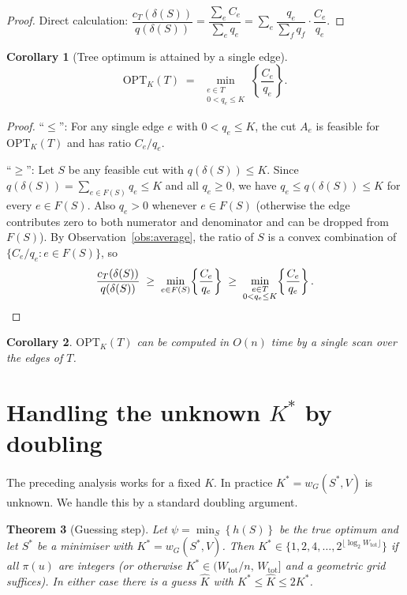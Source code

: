 \documentclass[11pt]{article}
\newtheorem{theorem}{Theorem}
\newtheorem{corollary}[theorem]{Corollary}
\newcommand{\cut}{\delta}
\newcommand{\OPT}{\mathrm{OPT}}
\newcommand{\brc}[1]{\mathopen{}\left\{ #1 \right\}}
\begin{document}
\begin{proof}
  Direct calculation:
  $\dfrac{c_T(\cut(S))}{q(\cut(S))}
  =\dfrac{\sum_e C_e}{\sum_e q_e}
  =\sum_e \dfrac{q_e}{\sum_f q_f}\cdot\dfrac{C_e}{q_e}$.
\end{proof}

\begin{corollary}[Tree optimum is attained by a single edge]\label{cor:single-edge}
  \[
    \OPT_K(T)
    \;=\;
    \min_{\substack{e\in T \\ 0<q_e\le K}} \brc{\frac{C_e}{q_e}}.
  \]
\end{corollary}

\begin{proof}
  ``$\le$'': For any single edge $e$ with $0<q_e\le K$, the cut $A_e$ is feasible
  for $\OPT_K(T)$ and has ratio $C_e/q_e$.

  ``$\ge$'': Let $S$ be any feasible cut with $q(\cut(S))\le K$.
  Since $q(\cut(S))=\sum_{e\in F(S)}q_e\le K$ and all $q_e\ge 0$, we have
  $q_e\le q(\cut(S))\le K$ for every $e\in F(S)$.
  Also $q_e>0$ whenever $e\in F(S)$ (otherwise the edge contributes zero to both
  numerator and denominator and can be dropped from $F(S)$).
  By Observation~\ref{obs:average}, the ratio of $S$ is a convex combination of
  $\{C_e/q_e: e\in F(S)\}$, so
  \[
    \frac{c_T(\cut(S))}{q(\cut(S))}
    \;\ge\;
    \min_{e\in F(S)} \brc{\frac{C_e}{q_e}}
    \;\ge\;
    \min_{\substack{e\in T\\0<q_e\le K}} \brc{\frac{C_e}{q_e}}.
    \qedhere
  \]
\end{proof}

\begin{corollary}
  $\OPT_K(T)$ can be computed in $O(n)$ time by a single scan over the edges of $T$.
\end{corollary}

\section{Handling the unknown $K^*$ by doubling}

The preceding analysis works for a fixed $K$.  In practice $K^*=w_G(S^*,V)$ is
unknown.  We handle this by a standard doubling argument.

\begin{theorem}[Guessing step]\label{thm:guessing}
  Let $\psi=\min_{S}\brc{h(S)}$ be the true optimum and let $S^*$ be a minimiser with
  $K^*=w_G(S^*,V)$.  Then $K^*\in\{1,2,4,\dots,2^{\lfloor\log_2 W_{\mathrm{tot}}\rfloor}\}$
  if all $\pi(u)$ are integers (or otherwise $K^*\in(W_{\mathrm{tot}}/n,\,W_{\mathrm{tot}}]$
  and a geometric grid suffices).  In either case there is a guess $\hat K$ with
  $K^*\le \hat K\le 2K^*$.
\end{theorem}
\end{document}
